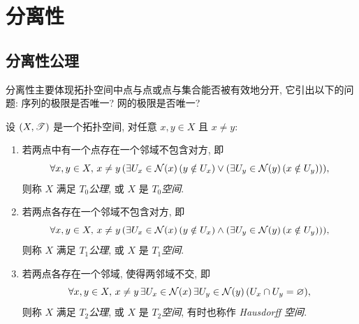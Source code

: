 
\section{分离性}

\subsection{分离性公理}

    分离性主要体现拓扑空间中点与点或点与集合能否被有效地分开, 它引出以下的问题: 序列的极限是否唯一? 网的极限是否唯一?

    \begin{Definition}[$ T_0,T_1,T_2 $公理]
        设 $ (X,\mathscr{T}) $ 是一个拓扑空间, 对任意 $ x,y\in X $ 且 $ x\ne y $:
        \begin{enumerate}
            \item 若两点中有一个点存在一个邻域不包含对方, 即
            \[
                \forall x,y\in X,\, x\ne y\,(\exists U_x\in\mathcal{N}(x)\,(y\notin U_x)\lor(\exists U_y\in\mathcal{N}(y)\,(x\notin U_y))),
            \]
            则称 $ X $ 满足 $ T_0 $\emph{公理}, 或 $ X $ 是 $ T_0 $\emph{空间}.
            \item 若两点各存在一个邻域不包含对方, 即
            \[
                \forall x,y\in X,\, x\ne y\,(\exists U_x\in\mathcal{N}(x)\,(y\notin U_x)\land(\exists U_y\in\mathcal{N}(y)\,(x\notin U_y))),
            \]
            则称 $ X $ 满足 $ T_1 $\emph{公理}, 或 $ X $ 是 $ T_1 $\emph{空间}.
            \item 若两点各存在一个邻域, 使得两邻域不交, 即
            \[
                \forall x,y\in X,\, x\ne y\,\exists U_x\in\mathcal{N}(x)\,\exists U_y\in\mathcal{N}(y)\,(U_x\cap U_y=\varnothing),
            \]
            则称 $ X $ 满足 $ T_2 $\emph{公理}, 或 $ X $ 是 $ T_2 $\emph{空间}, 有时也称作 \emph{Hausdorff 空间}.
        \end{enumerate}
    \end{Definition}

